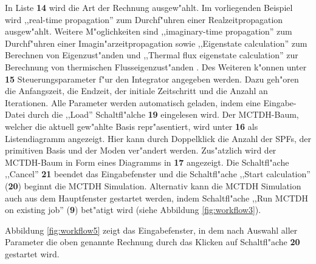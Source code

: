 In Liste \textbf{14} wird die Art der Rechnung ausgew"ahlt. Im vorliegenden Beispiel wird ,,real-time propagation'' 
zum Durchf"uhren einer Realzeitpropagation ausgew"ahlt.
Weite\-re M"oglichkeiten sind ,,imaginary-time propagation'' zum Durchf"uhren einer Imagin"arzeitpropagation 
sowie ,,Eigenstate calculation'' zum Berechnen von Eigenzust"anden und 
,,Thermal flux eigenstate calculation'' zur Berechnung von thermischen Flusseigenzust"an\-den \cite{thermalflux}.
Des Weiteren k"onnen unter \textbf{15} Steuerungsparameter f"ur den Integrator angegeben werden. Dazu geh"oren die Anfangszeit, die Endzeit,
der initiale Zeitschritt und die Anzahl an Iterationen. 
Alle Parameter werden automatisch geladen, indem eine Eingabe-Datei durch 
die ,,Load'' Schaltfl"alche \textbf{19} eingelesen wird. 
Der MCTDH-Baum, welcher die aktuell gew"ahlte Basis repr"asentiert, wird unter \textbf{16} 
als Listendiagramm angezeigt. Hier
kann durch Doppelklick die Anzahl der SPFs, der primitiven Basis und der Moden ver"andert werden.
Zus"atzlich wird der MCTDH-Baum in Form eines Diagramms in \textbf{17} angezeigt. 
Die Schaltfl"ache ,,Cancel'' \textbf{21} beendet das Eingabefenster
und die Schaltfl"ache ,,Start calculation'' (\textbf{20}) beginnt die MCTDH Simulation.
Alternativ kann die MCTDH Simulation auch aus dem Hauptfenster gestartet werden,
indem Schaltfl"ache ,,Run MCTDH on existing job'' (\textbf{9}) bet"atigt wird (siehe Abbildung \ref{fig:workflow3}).

Abbildung \ref{fig:workflow5} zeigt das Eingabefenster, in dem nach Auswahl aller Parameter die oben genannte Rechnung 
durch das Klicken auf Schaltfl"ache \textbf{20} gestartet wird.

